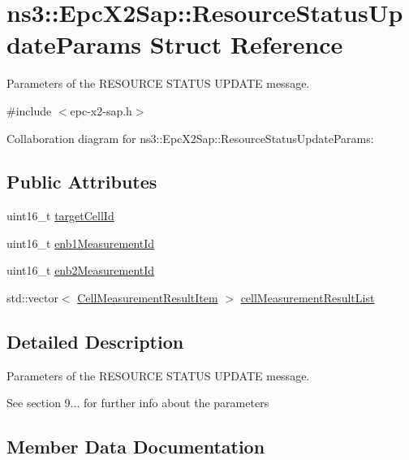 \hypertarget{structns3_1_1EpcX2Sap_1_1ResourceStatusUpdateParams}{}\section{ns3\+:\+:Epc\+X2\+Sap\+:\+:Resource\+Status\+Update\+Params Struct Reference}
\label{structns3_1_1EpcX2Sap_1_1ResourceStatusUpdateParams}


Parameters of the R\+E\+S\+O\+U\+R\+CE S\+T\+A\+T\+US U\+P\+D\+A\+TE message.  




{\ttfamily \#include $<$epc-\/x2-\/sap.\+h$>$}



Collaboration diagram for ns3\+:\+:Epc\+X2\+Sap\+:\+:Resource\+Status\+Update\+Params\+:
\subsection*{Public Attributes}
\begin{DoxyCompactItemize}
\item 
uint16\+\_\+t \hyperlink{structns3_1_1EpcX2Sap_1_1ResourceStatusUpdateParams_a9cc2e4be9a43ba47944e1014297282cf}{target\+Cell\+Id}
\item 
uint16\+\_\+t \hyperlink{structns3_1_1EpcX2Sap_1_1ResourceStatusUpdateParams_a7fc2ba581a9e7fcc9e49f3e6e9998a7a}{enb1\+Measurement\+Id}
\item 
uint16\+\_\+t \hyperlink{structns3_1_1EpcX2Sap_1_1ResourceStatusUpdateParams_a73804778f2182c33b1d75796aa2f5c43}{enb2\+Measurement\+Id}
\item 
std\+::vector$<$ \hyperlink{structns3_1_1EpcX2Sap_1_1CellMeasurementResultItem}{Cell\+Measurement\+Result\+Item} $>$ \hyperlink{structns3_1_1EpcX2Sap_1_1ResourceStatusUpdateParams_a92e644ca4a66d4200ced2d8910a4c98a}{cell\+Measurement\+Result\+List}
\end{DoxyCompactItemize}


\subsection{Detailed Description}
Parameters of the R\+E\+S\+O\+U\+R\+CE S\+T\+A\+T\+US U\+P\+D\+A\+TE message. 

See section 9... for further info about the parameters 

\subsection{Member Data Documentation}
